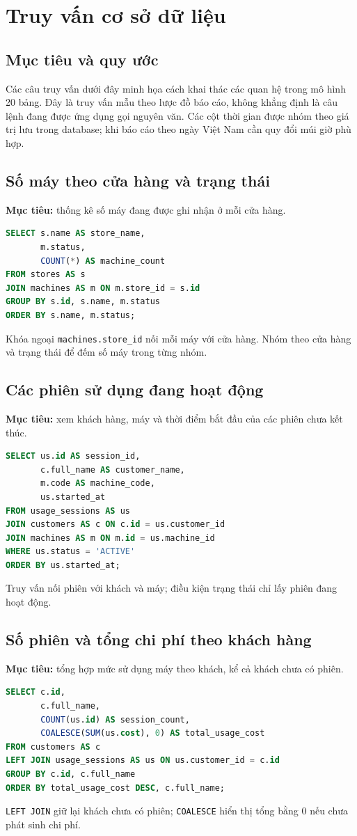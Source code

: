 \chapter{Truy vấn cơ sở dữ liệu}

\section{Mục tiêu và quy ước}
Các câu truy vấn dưới đây minh họa cách khai thác các quan hệ trong mô hình 20 bảng. Đây là truy vấn mẫu theo lược đồ báo cáo, không khẳng định là câu lệnh đang được ứng dụng gọi nguyên văn. Các cột thời gian được nhóm theo giá trị lưu trong database; khi báo cáo theo ngày Việt Nam cần quy đổi múi giờ phù hợp.

\section{Số máy theo cửa hàng và trạng thái}
\textbf{Mục tiêu:} thống kê số máy đang được ghi nhận ở mỗi cửa hàng.
\begin{lstlisting}[language=SQL]
SELECT s.name AS store_name,
       m.status,
       COUNT(*) AS machine_count
FROM stores AS s
JOIN machines AS m ON m.store_id = s.id
GROUP BY s.id, s.name, m.status
ORDER BY s.name, m.status;
\end{lstlisting}
Khóa ngoại \texttt{machines.store\_id} nối mỗi máy với cửa hàng. Nhóm theo cửa hàng và trạng thái để đếm số máy trong từng nhóm.

\section{Các phiên sử dụng đang hoạt động}
\textbf{Mục tiêu:} xem khách hàng, máy và thời điểm bắt đầu của các phiên chưa kết thúc.
\begin{lstlisting}[language=SQL]
SELECT us.id AS session_id,
       c.full_name AS customer_name,
       m.code AS machine_code,
       us.started_at
FROM usage_sessions AS us
JOIN customers AS c ON c.id = us.customer_id
JOIN machines AS m ON m.id = us.machine_id
WHERE us.status = 'ACTIVE'
ORDER BY us.started_at;
\end{lstlisting}
Truy vấn nối phiên với khách và máy; điều kiện trạng thái chỉ lấy phiên đang hoạt động.

\section{Số phiên và tổng chi phí theo khách hàng}
\textbf{Mục tiêu:} tổng hợp mức sử dụng máy theo khách, kể cả khách chưa có phiên.
\begin{lstlisting}[language=SQL]
SELECT c.id,
       c.full_name,
       COUNT(us.id) AS session_count,
       COALESCE(SUM(us.cost), 0) AS total_usage_cost
FROM customers AS c
LEFT JOIN usage_sessions AS us ON us.customer_id = c.id
GROUP BY c.id, c.full_name
ORDER BY total_usage_cost DESC, c.full_name;
\end{lstlisting}
\texttt{LEFT JOIN} giữ lại khách chưa có phiên; \texttt{COALESCE} hiển thị tổng bằng 0 nếu chưa phát sinh chi phí.

